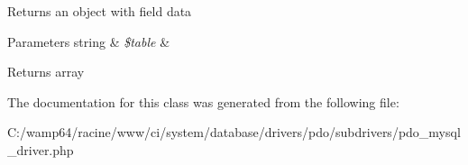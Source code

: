 Returns an object with field data


\begin{DoxyParams}[1]{Parameters}
string & {\em \$table} & \\
\hline
\end{DoxyParams}
\begin{DoxyReturn}{Returns}
array 
\end{DoxyReturn}


The documentation for this class was generated from the following file\+:\begin{DoxyCompactItemize}
\item 
C\+:/wamp64/racine/www/ci/system/database/drivers/pdo/subdrivers/pdo\+\_\+mysql\+\_\+driver.\+php\end{DoxyCompactItemize}
